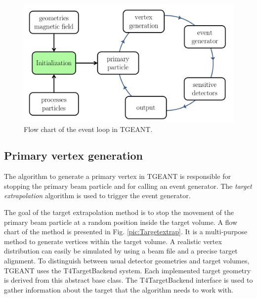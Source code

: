 \begin{figure}[!h]
  \centering
	\includegraphics[scale=0.5]{./gfx/EventLoop.png}
	\caption{Flow chart of the event loop in TGEANT.}
	\label{pic:EventLoop}
\end{figure}

\subsection{Primary vertex generation}

The algorithm to generate a primary vertex in TGEANT is responsible for stopping the primary beam particle and for calling an event generator. The \textit{target extrapolation} algorithm is used to trigger the event generator.

The goal of the target extrapolation method is to stop the movement of the primary beam particle at a random position inside the target volume. A flow chart of the method is presented in Fig. \ref{pic:Targetextrap}. It is a multi-purpose method to generate vertices within the target volume. A realistic vertex distribution can easily be simulated by using a beam file and a precise target alignment.
To distinguish between usual detector geometries and target volumes, TGEANT uses the T4TargetBackend system. Each implemented target geometry is derived from this abstract base class. The T4TargetBackend interface is used to gather information about the target that the algorithm needs to work with.

